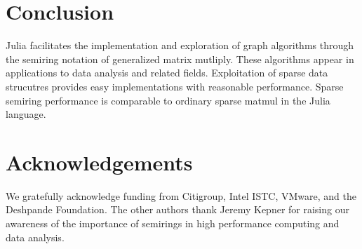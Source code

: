 \documentclass[conference]{IEEEtran}
\begin{document}
\section{Conclusion}

Julia facilitates the implementation and exploration of graph
algorithms through the semiring notation of generalized matrix
mutliply.  These algorithms appear in applications to data analysis
and related fields.  Exploitation of sparse data strucutres provides
easy implementations with reasonable performance.  Sparse semiring
performance is comparable to ordinary sparse matmul in the Julia
language.

\section{Acknowledgements}

We gratefully acknowledge funding from Citigroup, Intel ISTC, VMware, and the Deshpande Foundation.  The other authors thank Jeremy Kepner for raising our awareness of the importance of semirings in high performance computing and data analysis.  

\newpage


\end{document}
